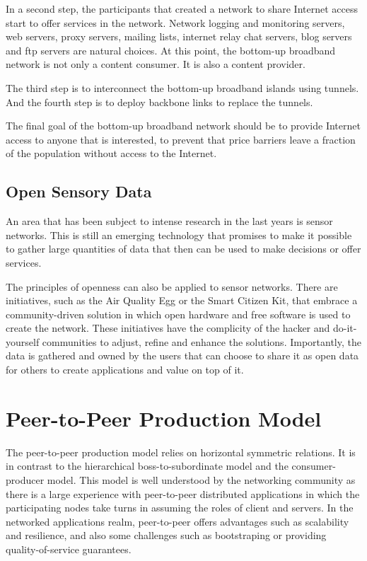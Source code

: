 \documentclass[journal]{IEEEtran}
\begin{document}
In a second step, the participants that created a network to share Internet access start to offer services in the network.
Network logging and monitoring servers, web servers, proxy servers, mailing lists, internet relay chat servers, blog servers and ftp servers are natural choices.
At this point, the bottom-up broadband network is not only a content consumer.
It is also a content provider.

The third step is to interconnect the bottom-up broadband islands using tunnels.
And the fourth step is to deploy backbone links to replace the tunnels.

The final goal of the bottom-up broadband network should be to provide Internet access to anyone that is interested, to prevent that price barriers leave a fraction of the population without access to the Internet.


\subsection{Open Sensory Data}

An area that has been subject to intense research in the last years is sensor networks.
This is still an emerging technology that promises to make it possible to gather large quantities of data that then can be used to make decisions or offer services.

The principles of openness can also be applied to sensor networks.
There are initiatives, such as the Air Quality Egg or the Smart Citizen Kit, that embrace a community-driven solution in which open hardware and free software is used to create the network.
These initiatives have the complicity of the hacker and do-it-yourself communities to adjust, refine and enhance the solutions.
Importantly, the data is gathered and owned by the users that can choose to share it as open data for others to create applications and value on top of it.


\section{Peer-to-Peer Production Model}
The peer-to-peer production model \cite{bauwens2009class} relies on horizontal symmetric relations.
It is in contrast to the hierarchical boss-to-subordinate model and the consumer-producer model.
This model is well understood by the networking community as there is a large experience with peer-to-peer distributed applications in which the participating nodes take turns in assuming the roles of client and servers.
In the networked applications realm, peer-to-peer offers advantages such as scalability and resilience, and also some challenges such as bootstraping or providing quality-of-service guarantees.
\end{document}

